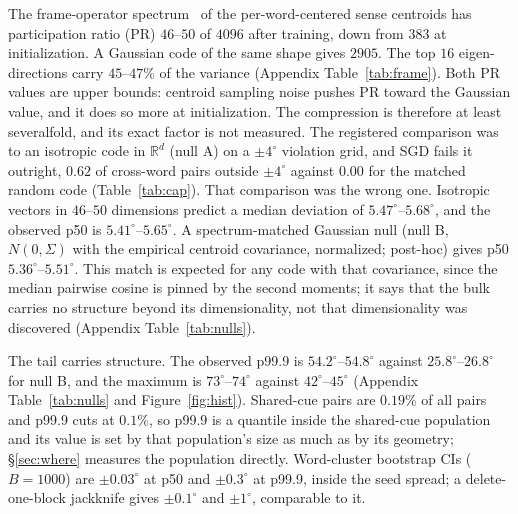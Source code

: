 \documentclass{article}
\newcommand{\degr}{^{\circ}}
\begin{document}
The frame-operator spectrum~\citep{ivanov2026spectral} of the per-word-centered
sense centroids has participation ratio (PR) $46$--$50$ of $4096$ after training,
down from $383$ at initialization. A Gaussian code of the same shape gives $2905$.
The top $16$ eigen-directions carry $45$--$47\%$ of the variance
(Appendix Table~\ref{tab:frame}). Both PR values are upper bounds: centroid
sampling noise pushes PR toward the Gaussian value, and it does so more at
initialization. The compression is therefore at least severalfold, and its exact
factor is not measured. The registered comparison was to an
isotropic code in $\mathbb{R}^d$ (null A) on a $\pm4\degr$ violation grid, and SGD
fails it outright, $0.62$ of cross-word pairs outside $\pm4\degr$ against $0.00$
for the matched random code (Table~\ref{tab:cap}). That comparison was the wrong
one. Isotropic vectors in $46$--$50$ dimensions predict a median deviation of
$5.47\degr$--$5.68\degr$, and the observed p50 is $5.41\degr$--$5.65\degr$. A
spectrum-matched Gaussian null (null B, $N(0,\Sigma)$ with the empirical centroid
covariance, normalized; post-hoc) gives p50 $5.36\degr$--$5.51\degr$. This match
is expected for any code with that covariance, since the median pairwise cosine
is pinned by the second moments; it says that the bulk carries no structure
beyond its dimensionality, not that dimensionality was discovered
(Appendix Table~\ref{tab:nulls}).

The tail carries structure. The observed p99.9 is $54.2\degr$--$54.8\degr$
against $25.8\degr$--$26.8\degr$ for null B, and the maximum is
$73\degr$--$74\degr$ against $42\degr$--$45\degr$ (Appendix Table~\ref{tab:nulls} and
Figure~\ref{fig:hist}). Shared-cue pairs are $0.19\%$ of all pairs and p99.9 cuts
at $0.1\%$, so p99.9 is a quantile inside the shared-cue population and its
value is set by that population's size as much as by its geometry; \S\ref{sec:where}
measures the population directly. Word-cluster bootstrap CIs ($B{=}1000$) are
$\pm0.03\degr$ at p50 and $\pm0.3\degr$ at p99.9, inside the seed spread; a
delete-one-block jackknife gives $\pm0.1\degr$ and $\pm1\degr$, comparable to it.
\end{document}
